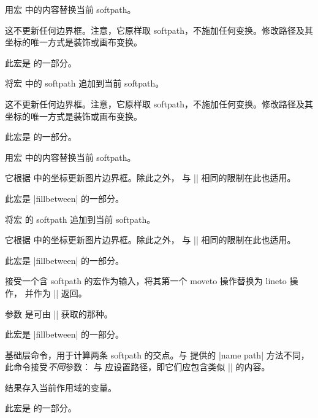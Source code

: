 \begin{command}{\pgfsetpath{}}
    用宏  中的内容替换当前 softpath。

    这不更新任何边界框。注意，它原样取 softpath，不施加任何变换。修改路径及其
    坐标的唯一方式是装饰或画布变换。

    此宏是 \pgfname{} 的一部分。
\end{command}
\begin{command}{\pgfaddpath{}}
    将宏  中的 softpath 追加到当前 softpath。

    这不更新任何边界框。注意，它原样取 softpath，不施加任何变换。修改路径及其
    坐标的唯一方式是装饰或画布变换。

    此宏是 \pgfname{} 的一部分。
\end{command}

\begin{command}{\pgfsetpathandBB{}}
    用宏  中的内容替换当前 softpath。

    它根据  中的坐标更新图片边界框。除此之外，
    与 |\pgfsetpath| 相同的限制在此也适用。

    此宏是 |fillbetween| 的一部分。
\end{command}

\begin{command}{\pgfaddpathandBB{}}
    将宏  的 softpath 追加到当前 softpath。

    它根据  中的坐标更新图片边界框。除此之外，
    与 |\pgfsetpath| 相同的限制在此也适用。

    此宏是 |fillbetween| 的一部分。
\end{command}

\begin{command}{\pgfpathreplacefirstmoveto{}}
    接受一个含 softpath 的宏作为输入，将其第一个 moveto 操作替换为 lineto 操作，
    并作为 |\pgfretval| 返回。

    参数  是可由 |\pgfgetpath| 获取的那种。

    此宏是 |fillbetween| 的一部分。
\end{command}

\begin{command}{\pgfintersectionofpaths{}}
    \pgfname{} 基础层命令，用于计算两条 softpath 的交点。与 \tikzname 提供的
    |name path| 方法不同，此命令接受\emph{不同}参数： 与
     应设置路径，即它们应包含类似 |\pgfsetpath{\somesoftpath}|
    的内容。

    结果存入当前作用域的变量。

    此宏是 \pgfname{} 的一部分。
\end{command}


